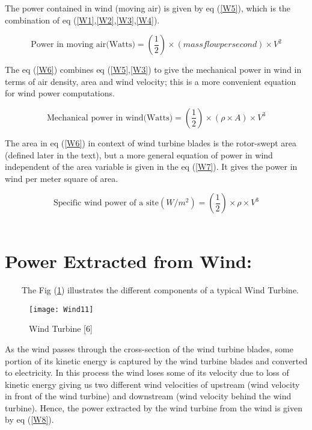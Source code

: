 The power contained in wind (moving air) is given by eq (\ref{W5}), which is the combination of eq (\ref{W1},\ref{W2},\ref{W3},\ref{W4}).

\begin{equation}
\label{W5}
\text{Power in moving air(Watts)} = \left(\frac{1}{2}\right)\times (mass flow per second)\times V^2 
\end{equation}

The eq (\ref{W6}) combines eq (\ref{W5},\ref{W3}) to give the mechanical power in wind in terms of air density, area and wind velocity; this is a more convenient equation for wind power computations.

\begin{equation}
\label{W6}
\text{Mechanical power in wind(Watts)} = \left(\frac{1}{2}\right) \times (\rho \times A ) \times V^3
\end{equation}

The area in eq (\ref{W6}) in context of wind turbine blades is the rotor-swept area (defined later in the text), but a more general equation of power in wind independent of the area variable is given in the eq (\ref{W7}). It gives the power in wind per meter square of area.

\begin{equation}
\label{W7}
\text{Specific wind power of a site} (W/m^2) = \left(\frac{1}{2}\right) \times \rho \times V^3 
\end{equation}\\



\section{Power Extracted from Wind:}
\
\
\
\
The Fig (\ref{figc5h1}) illustrates the different components of a typical Wind Turbine.

\begin{figure}[H]
\centering
\texttt{[image: Wind11]}
\caption{Wind Turbine [6]}
\label{figc5h1} %
\end{figure}

As the wind passes through the cross-section of the wind turbine blades, some portion of its kinetic energy is captured by the wind turbine blades and converted to electricity. In this process the wind loses some of its velocity due to loss of kinetic energy giving us two different wind velocities of upstream (wind velocity in front of the wind turbine) and downstream (wind velocity behind the wind turbine). Hence, the power extracted by the wind turbine from the wind is given by eq (\ref{W8}).

